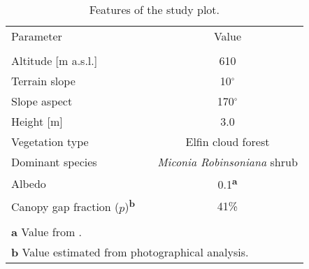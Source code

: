 \documentclass[a4paper,12pt]{article}
\begin{document}
\begin{table}[H]
           \caption[Features of the study plot]{Features of the study plot.} \label{tb:fog_descrip}
           \centering
           \footnotesize
            \colorbox{gray!15} {
\centering
            \begin{tabular}{lcc}
            Parameter&&Value\\ 
            \hhline{---} \\[-8pt]
            Altitude [m a.s.l.]&&610\\
            Terrain slope&&10$^{\circ}$\\
            Slope aspect&&170$^{\circ}$\\
            Height [m]&&3.0\\			
			Vegetation type&&Elfin cloud forest\\
			Dominant species&&\emph{Miconia Robinsoniana} shrub\\
			Albedo&&0.1\textsuperscript{\textcolor{Blue4}{\bf {\tiny{a}}}}\\
			Canopy gap fraction ($p$)\textsuperscript{\textcolor{Blue4}{\bf {\tiny{b}}}}&&41\%\\
			\hhline{---}\\ 	
			[-8pt]		             
            \multicolumn{3}{l}{\tiny \textcolor{Blue4}{\bf {\tiny{a}}} Value from \cite{Pryetetal2012a}.}\\
            [-3pt]
            \multicolumn{3}{l}{\tiny \textcolor{Blue4}{\bf {\tiny{b}}} Value estimated from photographical analysis.}
            \end{tabular}
            }
            \end{table}
\end{document}
